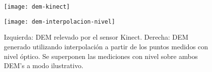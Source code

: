\begin{figure}[ht]
\centering
\begin{minipage}[h]{.45\textwidth}
\begin{center}
\texttt{[image: dem-kinect]}
\end{center}
\end{minipage}
\hfill
\begin{minipage}[h]{.45\textwidth}
\begin{center}
\texttt{[image: dem-interpolacion-nivel]}
\end{center}
\end{minipage}
\hfill
\caption[DEM obtenido con Kinect y DEM generado por interpolación]
{Izquierda: DEM relevado por el sensor Kinect. Derecha: DEM generado utilizando interpolación a partir de los puntos medidos con nivel óptico. Se superponen las mediciones con nivel sobre ambos DEM's a modo ilustrativo.}
\label{fig:comparacion-dem-kinect-interpolacion}
\end{figure}

